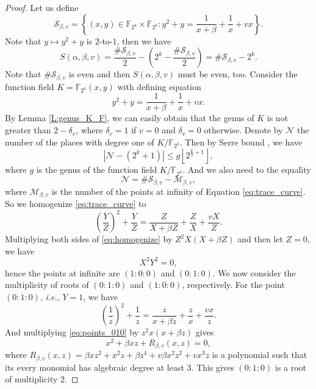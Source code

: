 \documentclass{article}
\newcommand{\F}{\mathbb{F}}
\newcommand{\0}{\textbf{0}}
\newcommand{\1}{\textbf{1}}
\theoremstyle{plain}
\begin{document}
\begin{proof}
        Let us define
        \[\mathcal{S}_{\beta,v}=\left\{(x,y)\in\F_{2^k}\times\F_{2^k} : y^2+y=\frac{1}{x+\beta}+\frac{1}{x}+vx\right\}.\]
        Note that $y\mapsto y^2+y$ is $2$-to-$1$, then we have
        \begin{equation}\label{eq:tracesum_S}
            S(\alpha,\beta,v)=\frac{\#\mathcal{S}_{\beta,v}}{2}-\left(2^k-\frac{\#\mathcal{S}_{\beta,v}}{2}\right)=\#\mathcal{S}_{\beta,v}-2^k.
        \end{equation}
        Note that $\#\mathcal{S}_{\beta,v}$ is even and then $S(\alpha,\beta,v)$ must be even, too.
        Consider the function field $K=\F_{2^k}(x,y)$ with defining equation
        \begin{equation}\label{eq:trace_curve}
            y^2+y=\frac{1}{x+\beta}+\frac{1}{x}+vx.
        \end{equation}
        By Lemma \ref{L:genus_K_F}, we can easily obtain that the genus of $K$ is not greater than $2-\delta_v$,
        where $\delta_v=1$ if $v=0$ and $\delta_v=0$ otherwise.
        Denote by $\mathcal{N}$ the number of the places with degree one of $K/\F_{2^k}$.
        Then by Serre bound \cite{Serre1982serrebound}, we have
        \begin{equation}\label{eq:N_genus_inequality}
            \left\lvert \mathcal{N}-(2^k+1)\right\rvert\le g\left\lfloor 2^{\frac{k}{2}+1}\right\rfloor,
        \end{equation}
        where $g$ is the genus of the function field $K/\F_{2^k}$.
        And we also need to the equality
        \begin{equation}\label{eq:N_S_M_equality}
            \mathcal{N}=\#\mathcal{S}_{\beta,v}-\mathcal{M}_{\beta,v},
        \end{equation}
        where $\mathcal{M}_{\beta,v}$ is the number of the points at infinity of Equation \eqref{eq:trace_curve}.
        So we homogenize \eqref{eq:trace_curve} to
        \begin{equation}\label{eq:homogenize}
            \left( \frac{Y}{Z} \right)^2+\frac{Y}{Z}=\frac{Z}{X+\beta Z}+\frac{Z}{X}+\frac{vX}{Z}.
        \end{equation}
        Multiplying both sides of \eqref{eq:homogenize} by $Z^2X\left( X+\beta Z \right)$ and then let $Z=0$,
        we have
        \[X^2Y^2=0,\]
        hence the points at infinite are $(1:0:0)$ and $(0:1:0)$.
        We now consider the multiplicity of roots of $(0 : 1 : 0)$ and $(1 : 0 : 0)$, respectively.
        For the point $(0 : 1 : 0 )$, \emph{i.e.}, $Y = 1$, we have
        \begin{equation}\label{eq:points_010}
            \left( \frac{1}{z} \right)^2+\frac{1}{z}=\frac{z}{x+\beta z}+\frac{z}{x}+\frac{vx}{z}.
        \end{equation}
        And multiplying \eqref{eq:points_010} by $z^2x(x+\beta z)$ gives
        \[x^2+\beta xz+R_{\beta,v}(x,z)=0,\]
        where $R_{\beta,v}(x,z)=\beta xz^2+x^2z+\beta z^4+v\beta x^2z^2+vx^3z$ is a polynomial
        such that its every monomial has algebraic degree at least $3$.
        This gives $(0 : 1 : 0)$ is a root of multiplicity $2$.


\end{proof}
\end{document}
